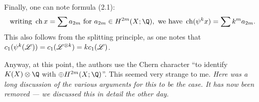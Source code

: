 \documentclass[11pt]{article}
\begin{document}
\begin{HopfInvOne}
Finally, one can note formula (2.1):
\[\text{writing }\ch x=\sum a_{2m}\text{ for }a_{2m}\in H^{2m}(X;\Q),\text{ we have }\ch (\psi^kx)=\sum k^ma_{2m}.\]
This also follows from the splitting principle, as one notes that $c_1(\psi^k(\mathscr{L}))=c_1(\mathscr{L}^{\otimes k})=kc_1(\mathscr{L})$.

Anyway, at this point, the authors use the Chern character ``to identify $K(X)\otimes \Q$ with $\oplus H^{2m}(X;\Q)$''. This seemed very strange to me. \textit{Here was a long discussion of the various arguments for this to be the case. It has now been removed --- we discussed this in detail the other day.} 

%


\end{HopfInvOne}
\end{document}
